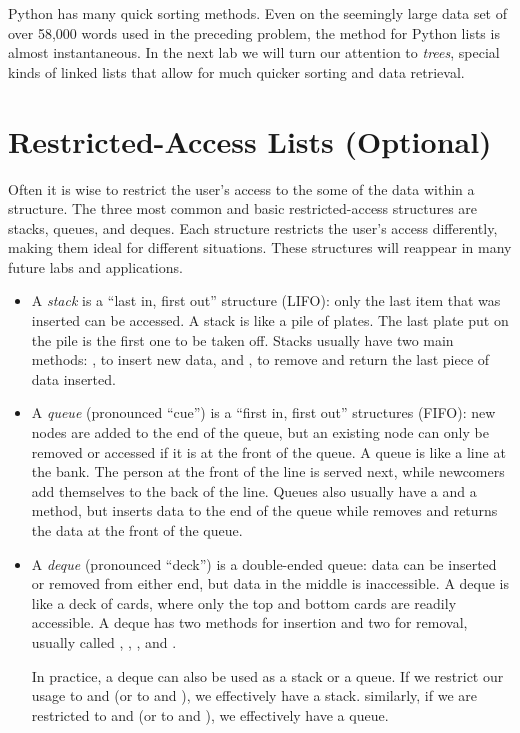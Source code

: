 Python has many quick sorting methods.
Even on the seemingly large data set of over 58,000 words used in the preceding problem, the  method for Python lists is almost instantaneous.
In the next lab we will turn our attention to \emph{trees}, special kinds of linked lists that allow for much quicker sorting and data retrieval.

\section*{Restricted-Access Lists (Optional)}
Often it is wise to restrict the user's access to the some of the data within a structure.
The three most common and basic restricted-access structures are stacks, queues, and deques.
Each structure restricts the user's access differently, making them ideal for different situations.
These structures will reappear in many future labs and applications.

\begin{itemize}
\item A \emph{stack} is a ``last in, first out'' structure (LIFO): only the last item that was inserted can be accessed.
A stack is like a pile of plates.
The last plate put on the pile is the first one to be taken off.
Stacks usually have two main methods: , to insert new data, and , to remove and return the last piece of data inserted.

\item A \emph{queue} (pronounced ``cue'') is a ``first in, first out'' structures (FIFO): new nodes are added to the end of the queue, but an existing node can only be removed or accessed if it is at the front of the queue.
A queue is like a line at the bank.
The person at the front of the line is served next, while newcomers add themselves to the back of the line.
Queues also usually have a  and a  method, but  inserts data to the end of the queue while  removes and returns the data at the front of the queue.

\item A \emph{deque} (pronounced ``deck'') is a double-ended queue: data can be inserted or removed from either end, but data in the middle is inaccessible.
A deque is like a deck of cards, where only the top and bottom cards are readily accessible.
A deque has two methods for insertion and two for removal, usually called , , , and .

In practice, a deque can also be used as a stack or a queue.
If we restrict our usage to  and  (or to  and ), we effectively have a stack.
similarly, if we are restricted to  and  (or to  and ), we effectively have a queue.
\end{itemize}

